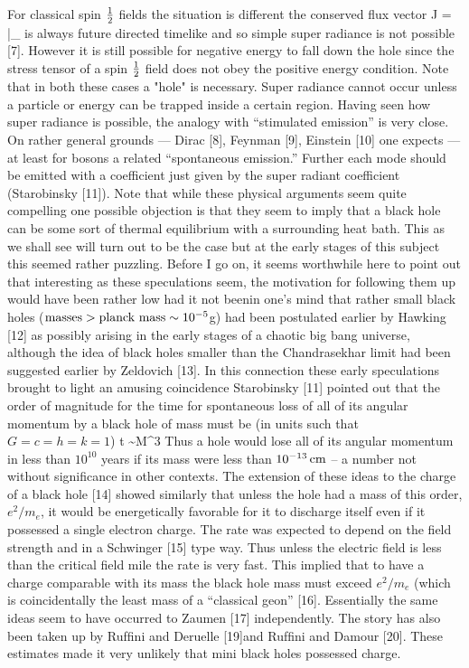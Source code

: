 For classical spin $\small{\frac{1}{2}}$
fields the situation is different the conserved flux vector
\be
J = \bar\psi \GG_\mu \psi
\ee
is always future directed timelike and so simple super radiance is not possible [7].
However it is still possible for negative energy to fall down the hole since the stress
tensor of a spin $\small{\frac{1}{2}}$ ﬁeld does not obey the positive energy condition. Note that in both
these cases a "hole" is necessary. Super radiance cannot occur unless a particle or energy
can be trapped inside a certain region. Having seen how super radiance is possible, the analogy
with ``stimulated emission'' is very close. On rather general grounds --- Dirac [8], Feynman [9],
Einstein [10] one expects --- at least for bosons a related ``spontaneous emission.''
Further each mode should be emitted with a coefficient just given by the super radiant
coefficient (Starobinsky [11]). Note that while these physical arguments seem quite
compelling one possible objection is that they seem to imply that a black hole can be some sort
of thermal equilibrium with a surrounding heat bath. This as we shall see will
turn out to be the case but at the early stages of this subject this seemed rather
puzzling. Before I go on, it seems worthwhile here to point out that interesting as these
speculations seem, the motivation for following them up would have been
rather low had it not beenin one's mind that rather small black holes
(${\rm masses} > {\hbox{\rm planck mass}} \sim 10^{-5}$g)
had been postulated earlier by Hawking [12] as possibly arising in the early stages of
a chaotic big bang universe, although the idea of black holes smaller than the Chandrasekhar
limit had been suggested earlier by Zeldovich [13]. In this connection these early
speculations brought to light an amusing coincidence Starobinsky [11] pointed out
that the order of magnitude for the time for spontaneous loss of all of its angular
momentum by a black hole of mass must be (in units such that $G = c = h = k = 1$)
\be
t \sim M^3
\ee
Thus a hole would lose all of its angular momentum in less than $10^{10}$
years if its mass were less than $10^{-13}\,{\rm cm}$ -- a number not without
significance in other contexts. The extension of these ideas to the charge
of a black hole [14] showed similarly that unless the hole had a mass
of this order, $e^2/m_e$, it would be energetically favorable for it to discharge
itself even if it possessed a single electron charge. The rate was expected
to depend on the ﬁeld strength and in a Schwinger [15] type way. Thus unless the
electric field is less than the critical ﬁeld mile the rate is very fast.
This implied that to have a charge comparable with its mass the black hole mass
must exceed $e^2/m_e$ (which is coincidentally the least mass of a ``classical geon'' [16].
Essentially the same ideas seem to have occurred to Zaumen [17] independently.
The story has also been taken up by Rufﬁni and Deruelle [19]and Rufﬁni and Damour [20].
These estimates made it very unlikely that mini black holes possessed charge.

